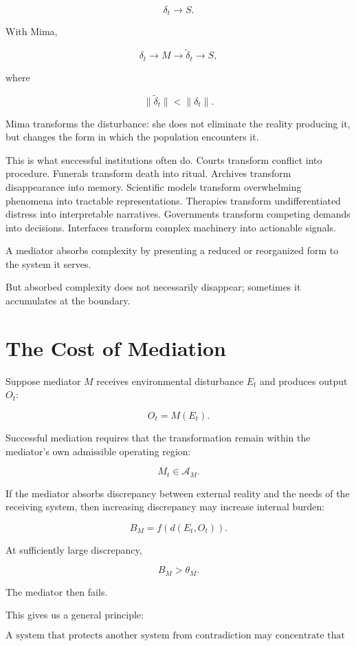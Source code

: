 \documentclass[11pt,oneside]{book}
\theoremstyle{definition}
\theoremstyle{remark}
\newcommand{\A}{\mathcal{A}}
\begin{document}
\[
\delta_t\rightarrow S.
\]

With Mima,

\[
\delta_t
\rightarrow
M
\rightarrow
\widetilde{\delta}_t
\rightarrow
S,
\]

where

\[
\|\widetilde{\delta}_t\|
<
\|\delta_t\|.
\]

Mima transforms the disturbance: she does not eliminate the reality producing it, but changes the form in which the population encounters it.

This is what successful institutions often do. Courts transform conflict into procedure. Funerals transform death into ritual. Archives transform disappearance into memory. Scientific models transform overwhelming phenomena into tractable representations. Therapies transform undifferentiated distress into interpretable narratives. Governments transform competing demands into decisions. Interfaces transform complex machinery into actionable signals.

A mediator absorbs complexity by presenting a reduced or reorganized form to the system it serves.

But absorbed complexity does not necessarily disappear; sometimes it accumulates at the boundary.

\section{The Cost of Mediation}

Suppose mediator \(M\) receives environmental disturbance \(E_t\) and produces output \(O_t\):

\[
O_t=M(E_t).
\]

Successful mediation requires that the transformation remain within the mediator's own admissible operating region:

\[
M_t\in\A_M.
\]

If the mediator absorbs discrepancy between external reality and the needs of the receiving system, then increasing discrepancy may increase internal burden:

\[
B_M
=
f\!\left(
d(E_t,O_t)
\right).
\]

At sufficiently large discrepancy,

\[
B_M>\theta_M.
\]

The mediator then fails.

This gives us a general principle:

\[
\boxed{
\text{A system that protects another system from contradiction may concentrate that contradiction within itself.}
}
\]
\end{document}

